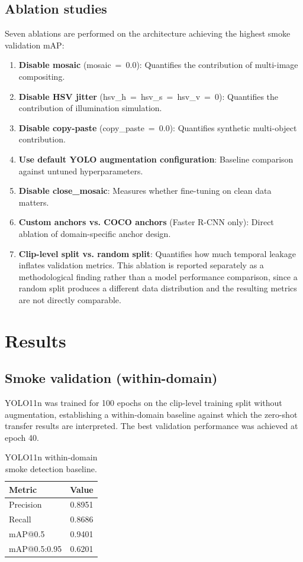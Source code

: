 \documentclass[10pt,twocolumn]{article}
\begin{document}
\subsection{Ablation studies}

Seven ablations are performed on the architecture achieving the highest smoke validation mAP:

\begin{enumerate}
    \item \textbf{Disable mosaic} (mosaic~=~0.0): Quantifies the contribution of multi-image compositing.
    \item \textbf{Disable HSV jitter} (hsv\_h~=~hsv\_s~=~hsv\_v~=~0): Quantifies the contribution of illumination simulation.
    \item \textbf{Disable copy-paste} (copy\_paste~=~0.0): Quantifies synthetic multi-object contribution.
    \item \textbf{Use default YOLO augmentation configuration}: Baseline comparison against untuned hyperparameters.
    \item \textbf{Disable close\_mosaic}: Measures whether fine-tuning on clean data matters.
    \item \textbf{Custom anchors vs. COCO anchors} (Faster R-CNN only): Direct ablation of domain-specific anchor design.
    \item \textbf{Clip-level split vs. random split}: Quantifies how much temporal leakage inflates validation metrics. This ablation is reported separately as a methodological finding rather than a model performance comparison, since a random split produces a different data distribution and the resulting metrics are not directly comparable.
\end{enumerate}

\section{Results}

\subsection{Smoke validation (within-domain)}

YOLO11n was trained for 100 epochs on the clip-level training split without augmentation, establishing a within-domain baseline against which the zero-shot transfer results are interpreted. The best validation performance was achieved at epoch 40.

\begin{table}[H]
\centering
\caption{YOLO11n within-domain smoke detection baseline.}
\label{tab:yolo_smoke}
\begin{tabular}{@{}lc@{}}
\toprule
\textbf{Metric} & \textbf{Value} \\
\midrule
Precision & 0.8951 \\
Recall & 0.8686 \\
mAP@0.5 & 0.9401 \\
mAP@0.5:0.95 & 0.6201 \\
\bottomrule
\end{tabular}
\end{table}
\end{document}
